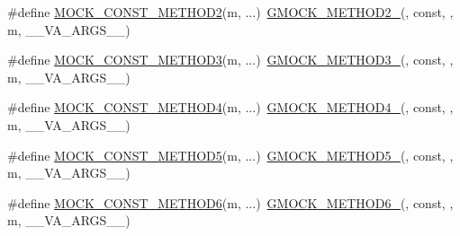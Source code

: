 \begin{DoxyCompactItemize}
\#define \mbox{\hyperlink{googletest-master_2googlemock_2include_2gmock_2gmock-generated-function-mockers_8h_a31c489715704817a3f40d178404c61e8}{M\+O\+C\+K\+\_\+\+C\+O\+N\+S\+T\+\_\+\+M\+E\+T\+H\+O\+D2}}(m, ...)~\mbox{\hyperlink{_obj__test_2lib_2googletest-release-1_88_81_2googlemock_2include_2gmock_2gmock-generated-function-mockers_8h_a885295ca6bebb15efb3fc786218c5d47}{G\+M\+O\+C\+K\+\_\+\+M\+E\+T\+H\+O\+D2\+\_\+}}(, const, , m, \+\_\+\+\_\+\+V\+A\+\_\+\+A\+R\+G\+S\+\_\+\+\_\+)
\item 
\#define \mbox{\hyperlink{googletest-master_2googlemock_2include_2gmock_2gmock-generated-function-mockers_8h_a9e67763df6705172e1a2ae92f1446bbc}{M\+O\+C\+K\+\_\+\+C\+O\+N\+S\+T\+\_\+\+M\+E\+T\+H\+O\+D3}}(m, ...)~\mbox{\hyperlink{_obj__test_2lib_2googletest-release-1_88_81_2googlemock_2include_2gmock_2gmock-generated-function-mockers_8h_af7c77ba511c631de02bb8c45a6ed3045}{G\+M\+O\+C\+K\+\_\+\+M\+E\+T\+H\+O\+D3\+\_\+}}(, const, , m, \+\_\+\+\_\+\+V\+A\+\_\+\+A\+R\+G\+S\+\_\+\+\_\+)
\item 
\#define \mbox{\hyperlink{googletest-master_2googlemock_2include_2gmock_2gmock-generated-function-mockers_8h_a4614e9d6b24dff60c30dd4dedf494c6c}{M\+O\+C\+K\+\_\+\+C\+O\+N\+S\+T\+\_\+\+M\+E\+T\+H\+O\+D4}}(m, ...)~\mbox{\hyperlink{_obj__test_2lib_2googletest-release-1_88_81_2googlemock_2include_2gmock_2gmock-generated-function-mockers_8h_ab6430f2cfad9de4aca5258ea559294bb}{G\+M\+O\+C\+K\+\_\+\+M\+E\+T\+H\+O\+D4\+\_\+}}(, const, , m, \+\_\+\+\_\+\+V\+A\+\_\+\+A\+R\+G\+S\+\_\+\+\_\+)
\item 
\#define \mbox{\hyperlink{googletest-master_2googlemock_2include_2gmock_2gmock-generated-function-mockers_8h_ab7021ec2b869e7c9ea90363ee675f19b}{M\+O\+C\+K\+\_\+\+C\+O\+N\+S\+T\+\_\+\+M\+E\+T\+H\+O\+D5}}(m, ...)~\mbox{\hyperlink{_obj__test_2lib_2googletest-release-1_88_81_2googlemock_2include_2gmock_2gmock-generated-function-mockers_8h_a9e3ecd392499ab19a4a6d3adcabf56f6}{G\+M\+O\+C\+K\+\_\+\+M\+E\+T\+H\+O\+D5\+\_\+}}(, const, , m, \+\_\+\+\_\+\+V\+A\+\_\+\+A\+R\+G\+S\+\_\+\+\_\+)
\item 
\#define \mbox{\hyperlink{googletest-master_2googlemock_2include_2gmock_2gmock-generated-function-mockers_8h_a5081a185ba264d599357398952c23af1}{M\+O\+C\+K\+\_\+\+C\+O\+N\+S\+T\+\_\+\+M\+E\+T\+H\+O\+D6}}(m, ...)~\mbox{\hyperlink{_obj__test_2lib_2googletest-release-1_88_81_2googlemock_2include_2gmock_2gmock-generated-function-mockers_8h_ad0ca7f6973a076d0af4c953f8ed91842}{G\+M\+O\+C\+K\+\_\+\+M\+E\+T\+H\+O\+D6\+\_\+}}(, const, , m, \+\_\+\+\_\+\+V\+A\+\_\+\+A\+R\+G\+S\+\_\+\+\_\+)

\end{DoxyCompactItemize}
